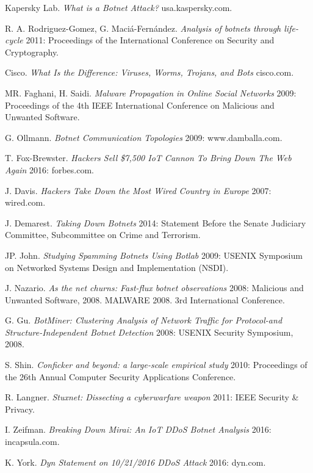 \pagebreak
\begin{thebibliography}{1}
   Kapersky Lab. {\em What is a Botnet Attack?}
    usa.kaspersky.com.

   R. A. Rodriguez-Gomez, G. Maciá-Fernández. {\em Analysis of botnets through life-cycle} 2011:
  Proceedings of the International Conference on Security and Cryptography.

   Cisco. {\em What Is the Difference: Viruses, Worms, Trojans, and Bots}
    cisco.com.

   MR. Faghani, H. Saidi. {\em Malware Propagation in Online Social Networks} 2009:
  Proceedings of the 4th IEEE International Conference on Malicious and Unwanted Software.

   G. Ollmann. {\em Botnet Communication Topologies} 2009:
    www.damballa.com.

   T. Fox-Brewster. {\em Hackers Sell \$7,500 IoT Cannon To Bring Down The Web Again} 2016:
    forbes.com.

   J. Davis. {\em Hackers Take Down the Most Wired Country in Europe} 2007:
    wired.com.

   J. Demarest. {\em Taking Down Botnets} 2014:
    Statement Before the Senate Judiciary Committee, Subcommittee on Crime and Terrorism.

   JP. John. {\em Studying Spamming Botnets Using Botlab}  2009:
    USENIX Symposium on Networked Systems Design and Implementation (NSDI).

   J. Nazario. {\em As the net churns: Fast-flux botnet observations}  2008:
     Malicious and Unwanted Software, 2008. MALWARE 2008. 3rd International Conference.

   G. Gu. {\em BotMiner: Clustering Analysis of Network Traffic for Protocol-and Structure-Independent Botnet Detection}  2008:
     USENIX Security Symposium, 2008.

   S. Shin. {\em Conficker and beyond: a large-scale empirical study}  2010:
    Proceedings of the 26th Annual Computer Security Applications Conference.

   R. Langner. {\em Stuxnet: Dissecting a cyberwarfare weapon}  2011:
     IEEE Security \& Privacy.

   I. Zeifman. {\em Breaking Down Mirai: An IoT DDoS Botnet Analysis}  2016:
     incapsula.com.

   K. York. {\em Dyn Statement on 10/21/2016 DDoS Attack}  2016:
     dyn.com.
\end{thebibliography}


